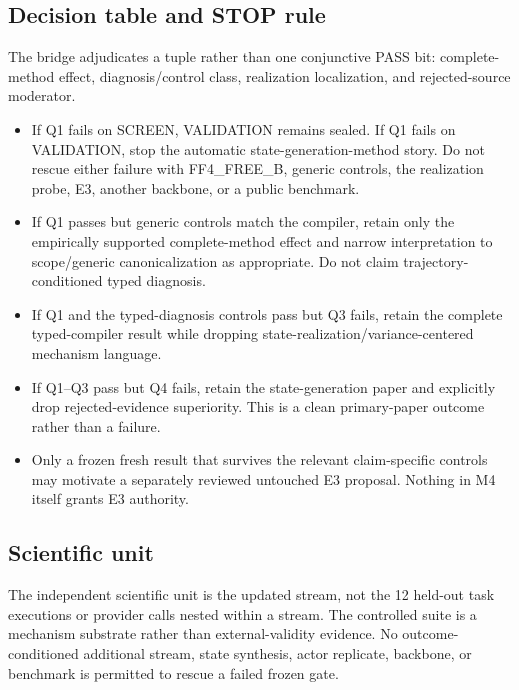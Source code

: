 \subsection{Decision table and STOP rule}
The bridge adjudicates a tuple rather than one conjunctive PASS bit: complete-method effect, diagnosis/control class, realization localization, and rejected-source moderator.
\begin{itemize}
    \item If Q1 fails on SCREEN, VALIDATION remains sealed. If Q1 fails on VALIDATION, stop the automatic state-generation-method story. Do not rescue either failure with FF4\_FREE\_B, generic controls, the realization probe, E3, another backbone, or a public benchmark.
    \item If Q1 passes but generic controls match the compiler, retain only the empirically supported complete-method effect and narrow interpretation to scope/generic canonicalization as appropriate. Do not claim trajectory-conditioned typed diagnosis.
    \item If Q1 and the typed-diagnosis controls pass but Q3 fails, retain the complete typed-compiler result while dropping state-realization/variance-centered mechanism language.
    \item If Q1--Q3 pass but Q4 fails, retain the state-generation paper and explicitly drop rejected-evidence superiority. This is a clean primary-paper outcome rather than a failure.
    \item Only a frozen fresh result that survives the relevant claim-specific controls may motivate a separately reviewed untouched E3 proposal. Nothing in M4 itself grants E3 authority.
\end{itemize}

\subsection{Scientific unit}
The independent scientific unit is the updated stream, not the 12 held-out task executions or provider calls nested within a stream. The controlled suite is a mechanism substrate rather than external-validity evidence. No outcome-conditioned additional stream, state synthesis, actor replicate, backbone, or benchmark is permitted to rescue a failed frozen gate.
